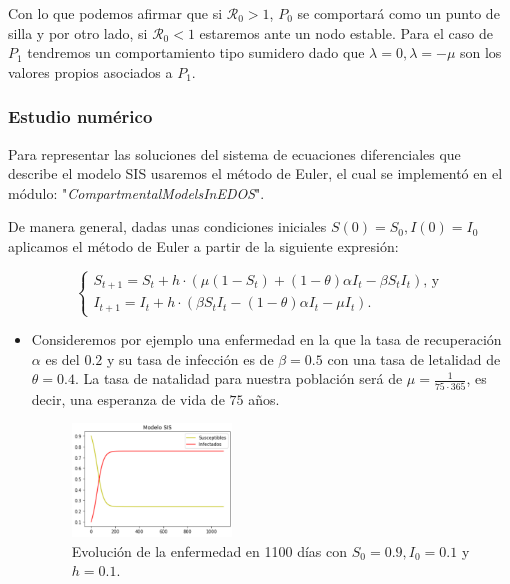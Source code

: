 Con lo que podemos afirmar que si $\mathcal{R}_0>1$, $P_0$ se comportará como un punto de silla y por otro lado, si $\mathcal{R}_0<1$ estaremos ante un nodo estable. Para el caso de $P_1$ tendremos un comportamiento tipo sumidero dado que $\lambda=0,\lambda=-\mu$ son los valores propios asociados a $P_1$.

\subsubsection{Estudio numérico}

Para representar las soluciones del sistema de ecuaciones diferenciales que describe el modelo SIS usaremos el método de Euler, el cual se implementó en el módulo: "\textit{CompartmentalModelsInEDOS}".

De manera general, dadas unas condiciones iniciales $S(0)=S_0,I(0)=I_0$ aplicamos el método de Euler a partir de la siguiente expresión:

$$\left\{\begin{array}{l}
S_{t+1} = S_t + h\cdot(\mu(1 - S_t) + (1 - \theta)\alpha I_t - \beta S_t I_t )\text{, y} \\
I_{t+1} = I_t + h\cdot(\beta S_t I_t - (1 - \theta)\alpha I_t - \mu I_t).
\end{array}\right.$$

\begin{itemize}
    \item Consideremos por ejemplo una enfermedad en la que la tasa de recuperación $\alpha$ es del $0.2$ y su tasa de infección es de $\beta=0.5$ con una tasa de letalidad de $\theta=0.4$. La tasa de natalidad para nuestra población será de $\mu=\frac{1}{75\cdot365}$, es decir, una esperanza de vida de $75$ años.
    
    \begin{figure}[h]
      \centering
        \includegraphics[width=0.4\textwidth]{Imagenes/ex1SIS.PNG}
      \caption{Evolución de la enfermedad en 1100 días con $S_0=0.9,I_0=0.1$ y $h=0.1$.}
      \label{fig:Ejemplo 2 - SIS}
    \end{figure}
\end{itemize}

